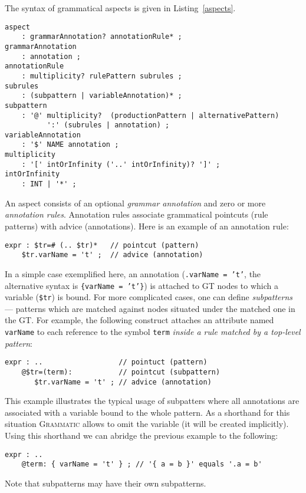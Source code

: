 \documentclass[10pt]{llncs}
\newcommand{\lstref}[1]{Listing~\ref{#1}}
\newcommand{\tool}[1]{\textsc{#1}}
\newcommand{\Grammatic}[0]{\tool{Grammatic}}
\begin{document}
The syntax of grammatical aspects is given in \lstref{aspects}. 
\begin{lstlisting}[language=Grammatic,float,label=aspects,caption=Grammar of the aspect language]
aspect
	: grammarAnnotation? annotationRule* ;
grammarAnnotation
	: annotation ;
annotationRule
	: multiplicity? rulePattern subrules ; 
subrules
	: (subpattern | variableAnnotation)* ;
subpattern
	: '@' multiplicity?  (productionPattern | alternativePattern) 
	      ':' (subrules | annotation) ;
variableAnnotation
	: '$' NAME annotation ;
multiplicity
	: '[' intOrInfinity ('..' intOrInfinity)? ']' ;
intOrInfinity
	: INT | '*' ;
\end{lstlisting}
An aspect consists of an optional \emph{grammar annotation} and zero or more \emph{annotation rules}. Annotation rules associate grammatical pointcuts (rule patterns) with advice (annotations). Here is an example of an annotation rule:
\begin{lstlisting}[language=Grammatic]
expr : $tr=# (.. $tr)*   // pointcut (pattern)
    $tr.varName = 't' ;  // advice (annotation)
\end{lstlisting}
In a simple case exemplified here, an annotation (\texttt{.varName = 't'}, the alternative syntax is \texttt{\{varName = 't'\}}) is attached to GT nodes to which a variable (\texttt{\$tr}) is bound.
For more complicated cases, one can define \emph{subpatterns} --- patterns which are matched against nodes situated under the matched one in the GT. For example, the following construct attaches an attribute named \texttt{varName} to each reference to the symbol \texttt{term} \emph{inside a rule matched by a top-level pattern}:
\begin{lstlisting}[language=Grammatic]
expr : ..                  // pointuct (pattern) 
    @$tr=(term):           // pointcut (subpattern)
       $tr.varName = 't' ; // advice (annotation)
\end{lstlisting}
This example illustrates the typical usage of subpatters where all annotations are associated with a variable bound to the whole pattern. As a shorthand for this situation \Grammatic{} allows to omit the variable (it will be created implicitly). Using this shorthand we can abridge the previous example to the following:
\begin{lstlisting}[language=Grammatic]
expr : ..               
    @term: { varName = 't' } ; // '{ a = b }' equals '.a = b'
\end{lstlisting}
Note that subpatterns may have their own subpatterns.
\end{document}
